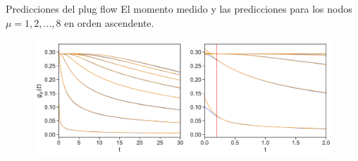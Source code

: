 \documentclass{beamer}
\newcommand{\esc}{\!\cdot\!}
\begin{document}
\begin{frame}{Predicciones del plug flow}
      El {\color{blue} momento medido} y las {\color{orange} predicciones} para los nodos $\mu=1, 2,...,8$ en orden ascendente.
\begin{figure}[!h]
\includegraphics[width=\linewidth]{gxtPredictions-17nodes-WALLS-defense2}
\end{figure}
\end{frame}

\end{document}
